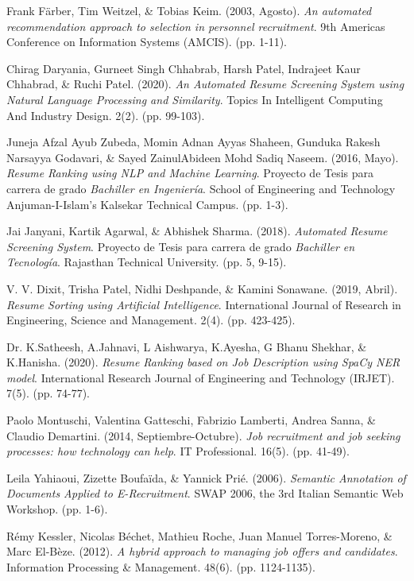 \documentclass[12pt,a4paper]{article}
\begin{document}
\begin{sloppypar}
\begin{thebibliography}{9}
Frank Färber, Tim Weitzel, \& Tobias Keim. (2003, Agosto). \textit{An automated recommendation approach to selection in personnel recruitment}. 9th Americas Conference on Information Systems (AMCIS). (pp. 1-11).

Chirag Daryania, Gurneet Singh Chhabrab, Harsh Patel, Indrajeet Kaur Chhabrad, \& Ruchi Patel. (2020). \textit{An Automated Resume Screening System using Natural Language Processing and Similarity}. Topics In Intelligent Computing And Industry Design. 2(2). (pp. 99-103).

Juneja Afzal Ayub Zubeda, Momin Adnan Ayyas Shaheen, Gunduka Rakesh Narsayya Godavari, \& Sayed ZainulAbideen Mohd Sadiq Naseem. (2016, Mayo). \textit{Resume Ranking using NLP and Machine Learning}. Proyecto de Tesis para carrera de grado \textit{Bachiller en Ingeniería}. School of Engineering and Technology Anjuman-I-Islam’s Kalsekar Technical Campus. (pp. 1-3).

Jai Janyani, Kartik Agarwal, \& Abhishek Sharma. (2018). \textit{Automated Resume Screening System}. Proyecto de Tesis para carrera de grado \textit{Bachiller en Tecnología}. Rajasthan Technical University. (pp. 5, 9-15).

V. V. Dixit, Trisha Patel, Nidhi Deshpande, \& Kamini Sonawane. (2019, Abril). \textit{Resume Sorting using Artificial Intelligence}. International Journal of Research in Engineering, Science and Management. 2(4). (pp. 423-425).

Dr. K.Satheesh, A.Jahnavi, L Aishwarya, K.Ayesha, G Bhanu Shekhar, \& K.Hanisha. (2020). \textit{Resume Ranking based on Job Description using SpaCy NER model}. International Research Journal of Engineering and Technology (IRJET). 7(5). (pp. 74-77).

Paolo Montuschi, Valentina Gatteschi, Fabrizio Lamberti, Andrea Sanna, \& Claudio Demartini. (2014, Septiembre-Octubre). \textit{Job recruitment and job seeking processes: how technology can help}. IT Professional. 16(5). (pp. 41-49).

Leila Yahiaoui, Zizette Boufaïda, \& Yannick Prié. (2006). \textit{Semantic Annotation of Documents Applied to E-Recruitment}. SWAP 2006, the 3rd Italian Semantic Web Workshop. (pp. 1-6).

Rémy Kessler, Nicolas Béchet, Mathieu Roche, Juan Manuel Torres-Moreno, \& Marc El-Bèze. (2012). \textit{A hybrid approach to managing job offers and candidates}. Information Processing \& Management. 48(6). (pp. 1124-1135).


\end{thebibliography}
\end{sloppypar}
\end{document}
